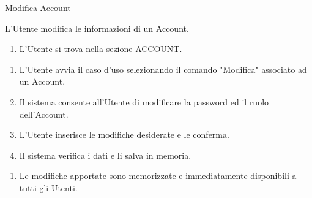 {\ucExtTable	%
{	%
	Modifica Account
	
}{	%
	
}{	%
	L'Utente modifica le informazioni di un Account.
	
}{	%
	\attori
	
}{	%
	\begin{enumerate}
        \item L'Utente si trova nella sezione ACCOUNT.
    \end{enumerate}
	
}{	%
	\begin{enumerate}
        \item L'Utente avvia il caso d'uso selezionando il comando "Modifica" associato ad un Account.
        \item Il sistema consente all'Utente di modificare la password ed il ruolo dell'Account.
        \item L'Utente inserisce le modifiche desiderate e le conferma.
        \item Il sistema verifica i dati e li salva in memoria.
    \end{enumerate}
	
}{	%
	\begin{enumerate}
        \item Le modifiche apportate sono memorizzate e immediatamente disponibili a tutti gli Utenti.
    \end{enumerate}
	
} }


